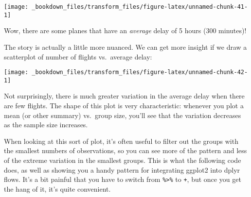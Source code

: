 \documentclass[]{book}
\newenvironment{Shaded}{\begin{snugshade}}{\end{snugshade}}
\newcommand{\KeywordTok}[1]{\textcolor[rgb]{0.13,0.29,0.53}{\textbf{{#1}}}}
\newcommand{\DataTypeTok}[1]{\textcolor[rgb]{0.13,0.29,0.53}{{#1}}}
\newcommand{\DecValTok}[1]{\textcolor[rgb]{0.00,0.00,0.81}{{#1}}}
\newcommand{\StringTok}[1]{\textcolor[rgb]{0.31,0.60,0.02}{{#1}}}
\newcommand{\OtherTok}[1]{\textcolor[rgb]{0.56,0.35,0.01}{{#1}}}
\newcommand{\NormalTok}[1]{{#1}}
\begin{document}
\begin{center}\texttt{[image: \_bookdown\_files/transform\_files/figure-latex/unnamed-chunk-41-1]} \end{center}

Wow, there are some planes that have an \emph{average} delay of 5 hours
(300 minutes)!

The story is actually a little more nuanced. We can get more insight if
we draw a scatterplot of number of flights vs.~average delay:

\begin{Shaded}
\end{Shaded}

\begin{center}\texttt{[image: \_bookdown\_files/transform\_files/figure-latex/unnamed-chunk-42-1]} \end{center}

Not surprisingly, there is much greater variation in the average delay
when there are few flights. The shape of this plot is very
characteristic: whenever you plot a mean (or other summary) vs.~group
size, you'll see that the variation decreases as the sample size
increases.

When looking at this sort of plot, it's often useful to filter out the
groups with the smallest numbers of observations, so you can see more of
the pattern and less of the extreme variation in the smallest groups.
This is what the following code does, as well as showing you a handy
pattern for integrating ggplot2 into dplyr flows. It's a bit painful
that you have to switch from \texttt{\%\textgreater{}\%} to \texttt{+},
but once you get the hang of it, it's quite convenient.
\end{document}
